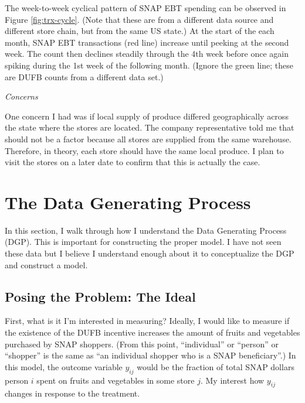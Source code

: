 \documentclass[12pt,letterpaperpaper,]{book}
\begin{document}
The week-to-week cyclical pattern of SNAP EBT spending can be observed
in Figure \ref{fig:trx-cycle}. (Note that these are from a different
data source and different store chain, but from the same US state.) At
the start of the each month, SNAP EBT transactions (red line) increase
until peeking at the second week. The count then declines steadily
through the 4th week before once again spiking during the 1st week of
the following month. (Ignore the green line; these are DUFB counts from
a different data set.)

\emph{Concerns}

One concern I had was if local supply of produce differed geographically
across the state where the stores are located. The company
representative told me that should not be a factor because all stores
are supplied from the same warehouse. Therefore, in theory, each store
should have the same local produce. I plan to visit the stores on a
later date to confirm that this is actually the case.

\section*{The Data Generating
Process}\label{the-data-generating-process}

In this section, I walk through how I understand the Data Generating
Process (DGP). This is important for constructing the proper model. I
have not seen these data but I believe I understand enough about it to
conceptualize the DGP and construct a model.

\subsection*{Posing the Problem: The
Ideal}\label{posing-the-problem-the-ideal}

First, what is it I'm interested in measuring? Ideally, I would like to
measure if the existence of the DUFB incentive increases the amount of
fruits and vegetables purchased by SNAP shoppers. (From this point,
``individual'' or ``person'' or ``shopper'' is the same as ``an
individual shopper who is a SNAP beneficiary''.) In this model, the
outcome variable \(y_{ij}\) would be the fraction of total SNAP dollars
person \(i\) spent on fruits and vegetables in some store \(j\). My
interest how \(y_{ij}\) changes in response to the treatment.
\end{document}
